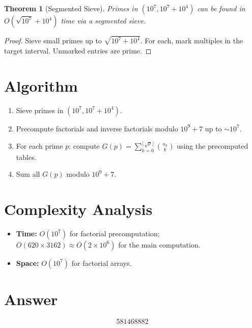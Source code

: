 \documentclass[11pt]{article}
\newtheorem{theorem}{Theorem}
\begin{document}
\begin{theorem}[Segmented Sieve]
Primes in $(10^7, 10^7 + 10^4)$ can be found in $O(\sqrt{10^7} + 10^4)$ time via a segmented sieve.
\end{theorem}

\begin{proof}
Sieve small primes up to $\sqrt{10^7 + 10^4}$. For each, mark multiples in the target interval. Unmarked entries are prime.
\end{proof}

\section{Algorithm}

\begin{enumerate}
    \item Sieve primes in $(10^7, 10^7 + 10^4)$.
    \item Precompute factorials and inverse factorials modulo $10^9 + 7$ up to $\sim 10^7$.
    \item For each prime $p$: compute $G(p) = \sum_{k=0}^{\lfloor\sqrt{p}\rfloor}\binom{n_k}{k}$ using the precomputed tables.
    \item Sum all $G(p)$ modulo $10^9 + 7$.
\end{enumerate}

\section{Complexity Analysis}

\begin{itemize}
    \item \textbf{Time:} $O(10^7)$ for factorial precomputation; $O(620 \times 3162) \approx O(2 \times 10^6)$ for the main computation.
    \item \textbf{Space:} $O(10^7)$ for factorial arrays.
\end{itemize}

\section{Answer}

\[
\boxed{581468882}
\]
\end{document}
